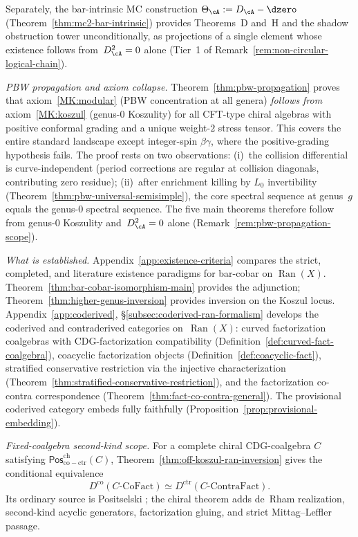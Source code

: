 Separately, the bar-intrinsic MC construction
$\Theta_\cA := D_\cA - \dzero$
(Theorem~\ref{thm:mc2-bar-intrinsic}) provides Theorems~D
and~H and the shadow obstruction tower unconditionally,
as projections of a single element whose existence
follows from~$D_\cA^2 = 0$ alone
(Tier~1 of
Remark~\ref{rem:non-circular-logical-chain}).

\emph{PBW propagation and axiom collapse.}
Theorem~\ref{thm:pbw-propagation} proves that
axiom~\ref{MK:modular} (PBW concentration at all genera)
\emph{follows from} axiom~\ref{MK:koszul} (genus-$0$
Koszulity) for all CFT-type chiral algebras with positive
conformal grading and a unique weight-$2$ stress tensor.
This covers the entire standard landscape except integer-spin $\beta\gamma$, where the positive-grading hypothesis fails. The proof
rests on two observations: (i)~the collision differential
is curve-independent (period corrections are regular at
collision diagonals, contributing zero residue);
(ii)~after enrichment killing by $L_0$ invertibility
(Theorem~\ref{thm:pbw-universal-semisimple}), the core
spectral sequence at genus~$g$ equals the genus-$0$
spectral sequence. The five main theorems therefore
follow from genus-$0$ Koszulity and~$D_\cA^2 = 0$ alone
(Remark~\ref{rem:pbw-propagation-scope}).

\emph{What is established.}
Appendix~\ref{app:existence-criteria} compares the strict,
completed, and literature existence paradigms for bar-cobar on
$\operatorname{Ran}(X)$. Theorem~\ref{thm:bar-cobar-isomorphism-main}
provides the adjunction; Theorem~\ref{thm:higher-genus-inversion}
provides inversion on the Koszul locus.
Appendix~\ref{app:coderived},
\S\ref{subsec:coderived-ran-formalism} develops the coderived
and contraderived categories on~$\operatorname{Ran}(X)$: curved
factorization coalgebras with CDG-factorization compatibility
(Definition~\ref{def:curved-fact-coalgebra}), coacyclic
factorization objects
(Definition~\ref{def:coacyclic-fact}), stratified conservative
restriction via the injective characterization
(Theorem~\ref{thm:stratified-conservative-restriction}),
and the factorization co-contra correspondence
(Theorem~\ref{thm:fact-co-contra-general}). The provisional
coderived category embeds fully faithfully
(Proposition~\ref{prop:provisional-embedding}).

\emph{Fixed-coalgebra second-kind scope.}
For a complete chiral CDG-coalgebra \(C\) satisfying
\(\mathsf{Pos}^{\mathrm{ch}}_{\mathrm{co-ctr}}(C)\),
Theorem~\ref{thm:off-koszul-ran-inversion} gives the conditional
equivalence
\[
D^{\mathrm{co}}(C\text{-}\mathrm{CoFact})
\simeq
D^{\mathrm{ctr}}(C\text{-}\mathrm{ContraFact}).
\]
Its ordinary source is Positselski
\cite[Theorem~5.2]{Positselski11}; the chiral theorem adds de~Rham
realization, second-kind acyclic generators, factorization gluing,
and strict Mittag--Leffler passage.


